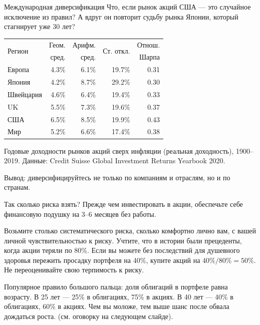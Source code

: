 \documentclass{beamer}
\begin{document}
\begin{frame}{Международная диверсификация}
\justify
Что, если рынок акций США --- это случайное исключение из правил? А вдруг он повторит судьбу рынка Японии, который стагнирует уже 30 лет?

\centering
\begin{tabular}{l|r|r|r|r}
\multirow{2}{*}{Регион} &
Геом. & 
Арифм. &
\multirow{2}{*}{Ст. откл.} &
Отнош. \\
& сред. & сред. & & Шарпа \\ \hline
Европа    & 4.3\% & 6.1\% & 19.7\% & 0.31 \\
Япония    & 4.2\% & 8.7\% & 29.2\% & 0.30 \\
Швейцария & 4.6\% & 6.4\% & 19.4\% & 0.33 \\
UK        & 5.5\% & 7.3\% & 19.6\% & 0.37 \\
США       & 6.5\% & 8.5\% & 19.9\% & 0.43 \\ \hline
Мир       & 5.2\% & 6.6\% & 17.4\% & 0.38
\end{tabular}

\centering
{\scriptsize Годовые доходности рынков акций сверх инфляции (реальная доходность),
1900--2019. Данные: Credit Suisse Global Investment Returns Yearbook 2020.}

\justify
Вывод: диверсифицируйтесь не только по компаниям и отраслям, но и по странам.
\end{frame}



\begin{frame}{Так сколько риска взять?}
\justify
Прежде чем инвестировать в акции, обеспечьте себе финансовую подушку на 3--6 месяцев без работы.

\justify
Возьмите столько систематического риска, сколько комфортно лично вам, с вашей личной 
чувствительностью к риску. Учтите, что в истории были прецеденты, когда акции теряли по 80\%. Если 
вы можете без последствий для душевного здоровья пережить просадку портфеля на 40\%, купите акций 
на $40\% / 80\% = 50\%$. Не переоценивайте свою терпимость к риску.

\justify
Популярное правило большого пальца: доля облигаций в портфеле равна возрасту. В 25 лет --- 25\% в 
облигациях, 75\% в акциях. В 40 лет --- 40\% в облигациях, 60\% в акциях. Чем вы моложе, тем выше 
шанс после обвала дождаться роста. (см. оговорку на следующем слайде).
\end{frame}
\end{document}
